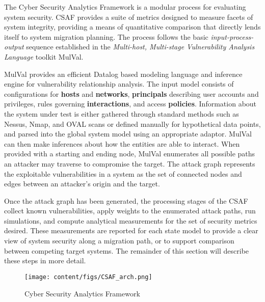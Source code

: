 The Cyber Security Analytics Framework\cite{Abraham_2016} is a modular process for evaluating system security. CSAF provides a suite of metrics designed to measure facets of system integrity, providing a means of quantitative comparison that directly lends itself to system migration planning. The process follows the basic \textit{input-process-output} sequence established in the \textit{Multi-host, Multi-stage Vulnerability Analysis Language}\cite{Ou_Appel_2005} toolkit MulVal.

MulVal provides an efficient\cite{Rao_1997} Datalog based modeling language and inference engine for vulnerability relationship analysis. The input model consists of configurations for \textbf{hosts} and \textbf{networks}, \textbf{principals} describing user accounts and privileges, rules governing \textbf{interactions}, and access \textbf{policies}. Information about the system under test is either gathered through standard methods\cite{Ou_Govindavajhala_Appel} such as Nessus, Nmap, and OVAL scans or defined manually for hypothetical data points, and parsed into the global system model using an appropriate adaptor. MulVal can then make inferences about how the entities are able to interact. When provided with a starting and ending node, MulVal enumerates all possible paths an attacker may traverse to compromise the target. The attack graph represents the exploitable vulnerabilities in a system as the set of connected nodes and edges between an attacker’s origin and the target.

Once the attack graph has been generated, the processing stages of the CSAF collect known vulnerabilities, apply weights to the enumerated attack paths, run simulations, and compute analytical measurements for the set of security metrics desired. These measurements are reported for each state model to provide a clear view of system security along a migration path, or to support comparison between competing target systems. The remainder of this section will describe these steps in more detail. %


\begin{figure*}[ht]
\centering
\texttt{[image: content/figs/CSAF\_arch.png]}
\caption{Cyber Security Analytics Framework\cite{Abraham_2016}}
\label{fig:framework}
\end{figure*} 
